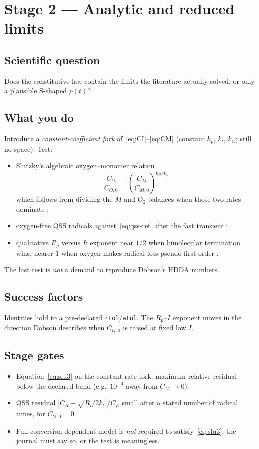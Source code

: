 \documentclass[11pt,a4paper]{article}
\begin{document}
\section{Stage 2 --- Analytic and reduced limits}

\subsection{Scientific question}
Does the constitutive law contain the limits the literature actually solved, or only a plausible S-shaped $p(t)$?

\subsection{What you do}
Introduce a \emph{constant-coefficient fork} of~\eqref{eq:CI}--\eqref{eq:CM} (constant $k_p$, $k_t$, $k_O$; still no space).
Test:
\begin{itemize}
  \item Slutzky's algebraic oxygen--monomer relation
    \begin{equation}
      \frac{C_O}{C_{O,0}} = \left(\frac{C_M}{C_{M,0}}\right)^{k_O/k_p}
      \label{eq:slu3}
    \end{equation}
    which follows from dividing the $M$ and $\mathrm{O}_2$ balances when those two rates dominate \citep{Slutzky2019};
  \item oxygen-free QSS radicals against~\eqref{eq:qss-ref} after the fast transient \citep{Zhu2020};
  \item qualitative $R_p$ versus $I$: exponent near $1/2$ when bimolecular termination wins, nearer $1$ when oxygen makes radical loss pseudo-first-order \citep{Dobson2024}.
\end{itemize}
The last test is \emph{not} a demand to reproduce Dobson's HDDA numbers.

\subsection{Success factors}
Identities hold to a pre-declared \texttt{rtol}/\texttt{atol}.
The $R_p$--$I$ exponent moves in the direction Dobson describes when $C_{O,0}$ is raised at fixed low $I$.

\subsection{Stage gates}
\begin{itemize}
  \item Equation~\eqref{eq:slu3} on the constant-rate fork: maximum relative residual below the declared band (e.g.\ $10^{-4}$ away from $C_M\to 0$).
  \item QSS residual $|C_R-\sqrt{R_i/2k_t}|/C_R$ small after a stated number of radical times, for $C_{O,0}=0$.
  \item Full conversion-dependent model is \emph{not} required to satisfy~\eqref{eq:slu3}; the journal must say so, or the test is meaningless.
\end{itemize}
\end{document}
